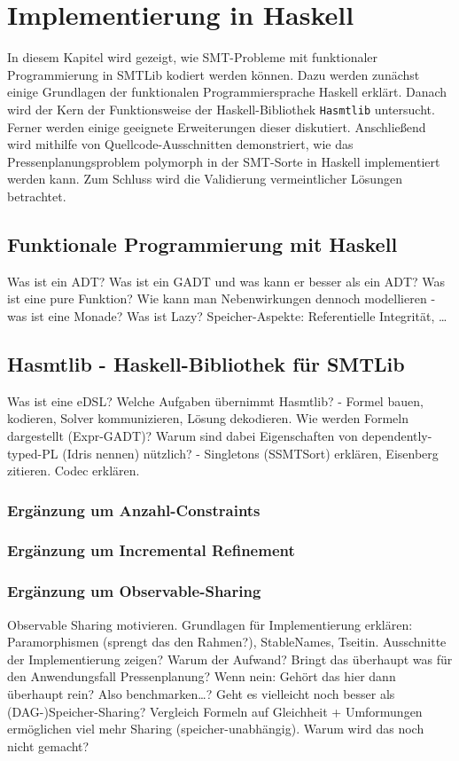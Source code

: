 \chapter{Implementierung in Haskell}
\label{chapter:implementierung}
In diesem Kapitel wird gezeigt, wie SMT-Probleme mit funktionaler Programmierung in SMTLib kodiert werden können.
Dazu werden zunächst einige Grundlagen der funktionalen Programmiersprache Haskell erklärt.
Danach wird der Kern der Funktionsweise der Haskell-Bibliothek \texttt{Hasmtlib} \cite{hasmtlib} untersucht.
Ferner werden einige geeignete Erweiterungen dieser diskutiert.
Anschließend wird mithilfe von Quellcode-Ausschnitten demonstriert, wie das Pressenplanungsproblem polymorph in der SMT-Sorte in Haskell implementiert werden kann.
Zum Schluss wird die Validierung vermeintlicher Lösungen betrachtet.

\section{Funktionale Programmierung mit Haskell}
Was ist ein ADT?
Was ist ein GADT und was kann er besser als ein ADT?
Was ist eine pure Funktion?
Wie kann man Nebenwirkungen dennoch modellieren - was ist eine Monade?
Was ist Lazy?
Speicher-Aspekte: Referentielle Integrität, \ldots

\section{Hasmtlib - Haskell-Bibliothek für SMTLib}
Was ist eine eDSL?
Welche Aufgaben übernimmt Hasmtlib? - Formel bauen, kodieren, Solver kommunizieren, Lösung dekodieren.
Wie werden Formeln dargestellt (Expr-GADT)?
Warum sind dabei Eigenschaften von dependently-typed-PL (Idris nennen) nützlich? - Singletons (SSMTSort) erklären, Eisenberg zitieren.
Codec erklären.

\subsection{Ergänzung um Anzahl-Constraints}

\subsection{Ergänzung um Incremental Refinement}

\subsection{Ergänzung um Observable-Sharing}
Observable Sharing motivieren.
Grundlagen für Implementierung erklären: Paramorphismen (sprengt das den Rahmen?), StableNames, Tseitin.
Ausschnitte der Implementierung zeigen?
Warum der Aufwand?
Bringt das überhaupt was für den Anwendungsfall Pressenplanung?
Wenn nein: Gehört das hier dann überhaupt rein?
Also benchmarken\ldots?
Geht es vielleicht noch besser als (DAG-)Speicher-Sharing?
Vergleich Formeln auf Gleichheit + Umformungen ermöglichen viel mehr Sharing (speicher-unabhängig).
Warum wird das noch nicht gemacht?

